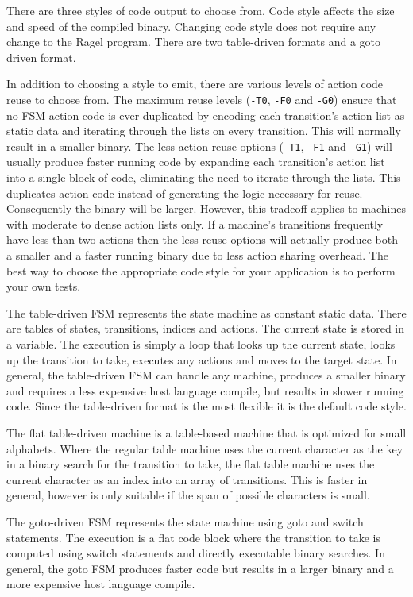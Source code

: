 \documentclass[letterpaper,11pt,oneside]{book}
\begin{document}
There are three styles of code output to choose from. Code style affects the
size and speed of the compiled binary. Changing code style does not require any
change to the Ragel program. There are two table-driven formats and a goto
driven format.

In addition to choosing a style to emit, there are various levels of action
code reuse to choose from.  The maximum reuse levels (\verb|-T0|, \verb|-F0|
and \verb|-G0|) ensure that no FSM action code is ever duplicated by encoding
each transition's action list as static data and iterating
through the lists on every transition. This will normally result in a smaller
binary. The less action reuse options (\verb|-T1|, \verb|-F1| and \verb|-G1|)
will usually produce faster running code by expanding each transition's action
list into a single block of code, eliminating the need to iterate through the
lists. This duplicates action code instead of generating the logic necessary
for reuse. Consequently the binary will be larger. However, this tradeoff applies to
machines with moderate to dense action lists only. If a machine's transitions
frequently have less than two actions then the less reuse options will actually
produce both a smaller and a faster running binary due to less action sharing
overhead. The best way to choose the appropriate code style for your
application is to perform your own tests.

The table-driven FSM represents the state machine as constant static data. There are
tables of states, transitions, indices and actions. The current state is
stored in a variable. The execution is simply a loop that looks up the current
state, looks up the transition to take, executes any actions and moves to the
target state. In general, the table-driven FSM can handle any machine, produces
a smaller binary and requires a less expensive host language compile, but
results in slower running code.  Since the table-driven format is the most
flexible it is the default code style.

The flat table-driven machine is a table-based machine that is optimized for
small alphabets. Where the regular table machine uses the current character as
the key in a binary search for the transition to take, the flat table machine
uses the current character as an index into an array of transitions. This is
faster in general, however is only suitable if the span of possible characters
is small.

The goto-driven FSM represents the state machine using goto and switch
statements. The execution is a flat code block where the transition to take is
computed using switch statements and directly executable binary searches.  In
general, the goto FSM produces faster code but results in a larger binary and a
more expensive host language compile.
\end{document}
